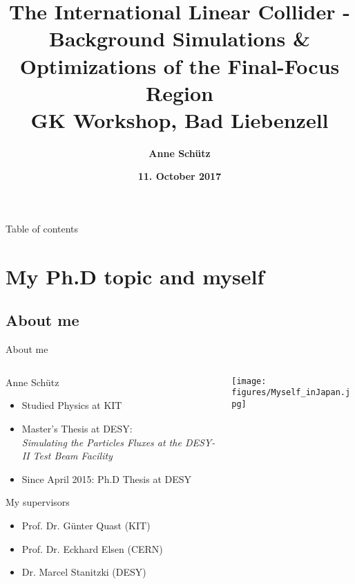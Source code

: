 \documentclass[xcolor={dvipsnames}]{beamer}
\title[ILC \& Background Simulations]{\textbf{\LARGE The International Linear Collider -\\ \large Background Simulations \& \\Optimizations of the Final-Focus Region \\\vspace*{0.2cm} \small GK Workshop, Bad Liebenzell}}
\author{\textbf{Anne Sch\"utz}}
\institute{\textbf{KIT, DESY}}
\date{\textbf{11. October 2017}}
\begin{document}
{
\begin{frame}
  \titlepage
\end{frame}
}

\begin{frame}{Table of contents}
\begin{multicols}{2}
  \tableofcontents
\end{multicols}
\end{frame}


\section{My Ph.D topic and myself}
\subsection{About me}

\begin{frame}{About me}
\begin{columns}
\begin{column}[T]{0.6\textwidth}
Anne Sch\"utz\\
\begin{itemize}
\item Studied Physics at KIT
\item Master's Thesis at DESY: \\ \textit{Simulating the Particles Fluxes at the DESY-II Test Beam Facility}
\item Since April 2015: Ph.D Thesis at DESY
\end{itemize}
\vspace*{0.7cm}
My supervisors\\
\begin{itemize}
\item Prof. Dr. G\"unter Quast (KIT)
\item Prof. Dr. Eckhard Elsen (CERN)
\item Dr. Marcel Stanitzki (DESY)
\end{itemize}
\end{column}

\begin{column}[T]{0.35\textwidth}
\vspace{0pt}%
\centering
	\texttt{[image: figures/Myself\_inJapan.jpg]}
\end{column}
\end{columns}

\end{frame}
\end{document}
